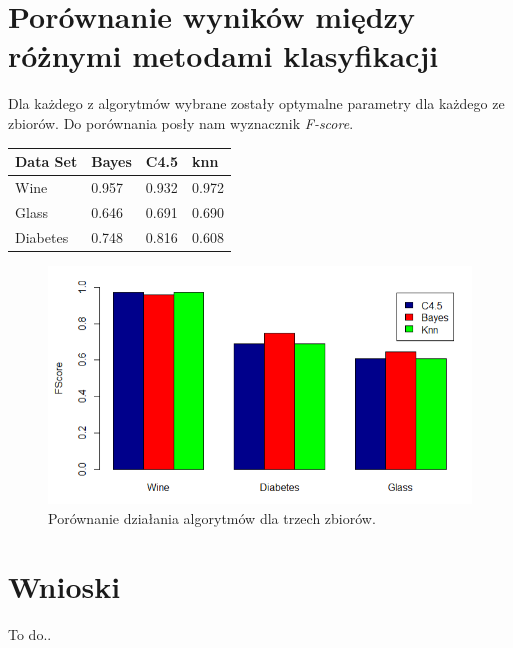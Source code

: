 \documentclass[12pt,a4paper]{article}
\begin{document}
\section{Porównanie wyników między różnymi metodami klasyfikacji}
Dla każdego z algorytmów wybrane zostały optymalne parametry dla każdego ze zbiorów. Do porównania posły nam wyznacznik \textit{F-score}.

\begin{tabular}{ |p{2.5cm}||p{2.5cm}|p{2.5cm}|p{2.5cm}| }
\hline
Data Set & Bayes & C4.5 & knn \\
\hline
Wine & 0.957 & 0.932 & 0.972 \\
Glass & 0.646 & 0.691 & 0.690 \\
Diabetes & 0.748 & 0.816 & 0.608 \\
\hline
\end{tabular}

\begin{figure}[H]
\centering
\includegraphics[width=1\textwidth]{Comparasion.PNG}
\caption{Porównanie działania algorytmów dla trzech zbiorów.}
\end{figure}

\section{Wnioski}
To do..
\end{document}
